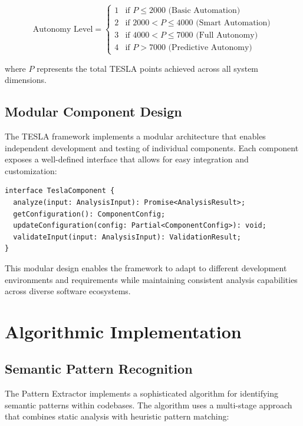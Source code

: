 \documentclass[10pt]{article}
\begin{document}
\begin{equation}
\text{Autonomy Level} = \begin{cases}
1 & \text{if } P \leq 2000 \text{ (Basic Automation)} \\
2 & \text{if } 2000 < P \leq 4000 \text{ (Smart Automation)} \\
3 & \text{if } 4000 < P \leq 7000 \text{ (Full Autonomy)} \\
4 & \text{if } P > 7000 \text{ (Predictive Autonomy)}
\end{cases}
\end{equation}

where $P$ represents the total TESLA points achieved across all system dimensions.

\subsection{Modular Component Design}

The TESLA framework implements a modular architecture that enables independent development and testing of individual components. Each component exposes a well-defined interface that allows for easy integration and customization:

\begin{lstlisting}[caption={TESLA Component Interface}]
interface TeslaComponent {
  analyze(input: AnalysisInput): Promise<AnalysisResult>;
  getConfiguration(): ComponentConfig;
  updateConfiguration(config: Partial<ComponentConfig>): void;
  validateInput(input: AnalysisInput): ValidationResult;
}
\end{lstlisting}

This modular design enables the framework to adapt to different development environments and requirements while maintaining consistent analysis capabilities across diverse software ecosystems.

\section{Algorithmic Implementation}

\subsection{Semantic Pattern Recognition}

The Pattern Extractor implements a sophisticated algorithm for identifying semantic patterns within codebases. The algorithm uses a multi-stage approach that combines static analysis with heuristic pattern matching:
\end{document}
